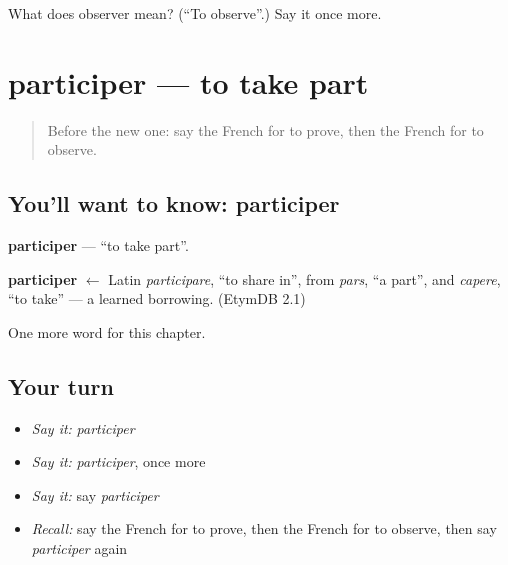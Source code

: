 \begin{tcolorbox}[breakable,colback=teal!4,colframe=teal!35!black,title={Before you move on}]
What does observer mean? (\textquotedblleft{}To observe\textquotedblright{}.) Say it once more.
\end{tcolorbox}
\section[participer]{participer — to take part}

\label{lesson:FR-C148-participer}



\begin{quote}
Before the new one: say the French for to prove, then the French for to observe.
\end{quote}

\subsection*{You'll want to know: participer}
\textbf{participer} — \textquotedblleft{}to take part\textquotedblright{}.

\begin{cousinweb}
\textbf{participer} $\leftarrow$ Latin \emph{participare}, \textquotedblleft{}to share in\textquotedblright{}, from \emph{pars}, \textquotedblleft{}a part\textquotedblright{}, and \emph{capere}, \textquotedblleft{}to take\textquotedblright{} — a learned borrowing. (EtymDB 2.1)
\end{cousinweb}

\begin{grammarlens}[title={What you've built}]
One more word for this chapter.
\end{grammarlens}

\subsection*{Your turn}
\begin{itemize}
\raggedright
  \item \emph{Say it:} \emph{participer}
  \item \emph{Say it:} \emph{participer}, once more
  \item \emph{Say it:} say \emph{participer}
  \item \emph{Recall:} say the French for to prove, then the French for to observe, then say \emph{participer} again
\end{itemize}

